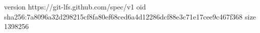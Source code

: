 version https://git-lfs.github.com/spec/v1
oid sha256:7a8096a32d298215cf8fa80ef68ced6a4d12286dcf88e3c71e17cee9c467f368
size 1398256
